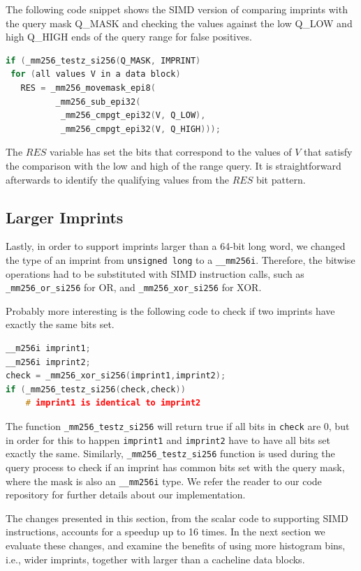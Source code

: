 \documentclass[sigconf]{acmart}
\begin{document}
The following code snippet shows the SIMD version of comparing imprints with the query mask Q\_MASK and checking the values against the low Q\_LOW and high Q\_HIGH ends of the query range for false positives.

\begin{lstlisting}[language=c]
if (_mm256_testz_si256(Q_MASK, IMPRINT)
 for (all values V in a data block)
   RES = _mm256_movemask_epi8(
          _mm256_sub_epi32(
           _mm256_cmpgt_epi32(V, Q_LOW),
           _mm256_cmpgt_epi32(V, Q_HIGH)));
\end{lstlisting}

The $RES$ variable has set the bits that correspond to the values of $V$ that satisfy the comparison with the low and high of the range query.
It is straightforward afterwards to identify the qualifying values from the $RES$ bit pattern.

\subsection{Larger Imprints}

Lastly, in order to support imprints larger than a 64-bit long word, we changed the type of an imprint from
\texttt{unsigned long} to a \texttt{\_\_mm256i}. Therefore, the bitwise operations had to be substituted with
SIMD instruction calls, such as \texttt{\_mm256\_or\_si256} for OR, and \texttt{\_mm256\_xor\_si256} for XOR.

Probably more interesting is the following code to check if two imprints have exactly the same bits set.

\begin{lstlisting}[language=c]
__m256i imprint1;
__m256i imprint2;
check = _mm256_xor_si256(imprint1,imprint2);
if (_mm256_testz_si256(check,check))
    # imprint1 is identical to imprint2 
\end{lstlisting}

The function \texttt{\_mm256\_testz\_si256} will return true if all bits in \texttt{check} are 0, but in order for
this to happen \texttt{imprint1} and \texttt{imprint2} have to have all bits set exactly the same.
Similarly, \texttt{\_mm256\_testz\_si256} function is used during the query process to check if an imprint has common
bits set with the query mask, where the mask is also an \texttt{\_\_mm256i} type. We refer the reader to our code 
repository for further details about our implementation.

The changes presented in this section, from the scalar code to supporting SIMD instructions, accounts for a speedup up to 16 times.
In the next section we evaluate these changes, and examine the benefits of using more histogram bins, i.e., wider imprints, together
with larger than a cacheline data blocks. 
\end{document}
